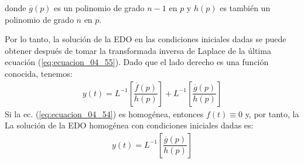 donde $\overline{g}(p)$ es un polinomio de grado $n-1$ en $p$ y $h(p)$ es también un polinomio de grado $n$ en $p$.
\par
Por lo tanto, la solución de la EDO en las condiciones iniciales dadas se puede obtener después de tomar la transformada inversa de Laplace de la última ecuación (\ref{eq:ecuacion_04_55}). Dado que el lado derecho es una función conocida, tenemos:
\begin{align}
y(t) = L^{-1} \left[ \dfrac{\overline{f}(p)}{h(p)} \right] + L^{-1} \left[ \dfrac{\overline{g}(p)}{h(p)} \right]
\label{eq:ecuacion_04_56}
\end{align}
Si la ec. (\ref{eq:ecuacion_04_54}) es homogénea, entonces $f (t) \equiv 0$ y, por tanto, la La solución de la EDO homogénea con condiciones iniciales dadas es:
\begin{align}
y(t) = L^{-1} \left[ \dfrac{\overline{g}(p)}{h(p)} \right]
\label{eq:ecuacion_04_57}
\end{align}

